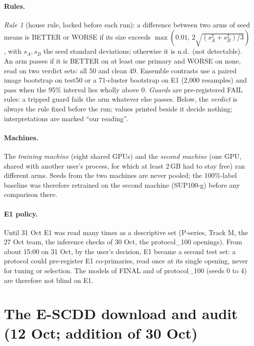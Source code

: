 \paragraph{Rules.} \emph{Rule 1} (house rule, locked before each run): a difference between two arms of seed means is BETTER or
WORSE if its size exceeds $\max(0.01,\, 2\sqrt{(s_A^2 + s_B^2)/3})$, with $s_A, s_B$ the seed standard deviations; otherwise it is
n.d.\ (not detectable). An arm passes if it is BETTER on at least one primary and WORSE on none, read on two verdict sets: all 50 and
clean 49. Ensemble contrasts use a paired image bootstrap on test50 or a 71-cluster bootstrap on E1 (2,000 resamples) and pass when
the 95\% interval lies wholly above 0. \emph{Guards} are pre-registered FAIL rules: a tripped guard fails the arm whatever else
passes. Below, the \emph{verdict} is always the rule fixed before the run; values printed beside it decide nothing; interpretations
are marked ``our reading''.

\paragraph{Machines.} The \emph{training machine} (eight shared GPUs) and the \emph{second machine} (one GPU, shared with another
user's process, for which at least 2\,GB had to stay free) ran different arms. Seeds from the two machines are never pooled; the 100\%-label
baseline was therefore retrained on the second machine (SUP100-g) before any comparison there.

\paragraph{E1 policy.} Until 31 Oct E1 was read many times as a descriptive set (P-series, Track M, the 27 Oct team, the
inference checks of 30 Oct, the protocol\_100 openings). From about 15:00 on 31 Oct, by the user's decision, E1 became a second
test set: a protocol could pre-register E1 co-primaries, read once at its single opening, never for tuning or selection. The models
of FINAL and of protocol\_100 (seeds 0 to 4) are therefore not blind on E1.

\section{The E-SCDD download and audit (12 Oct; addition of 30 Oct)}\label{sec:midnov-escdd}

